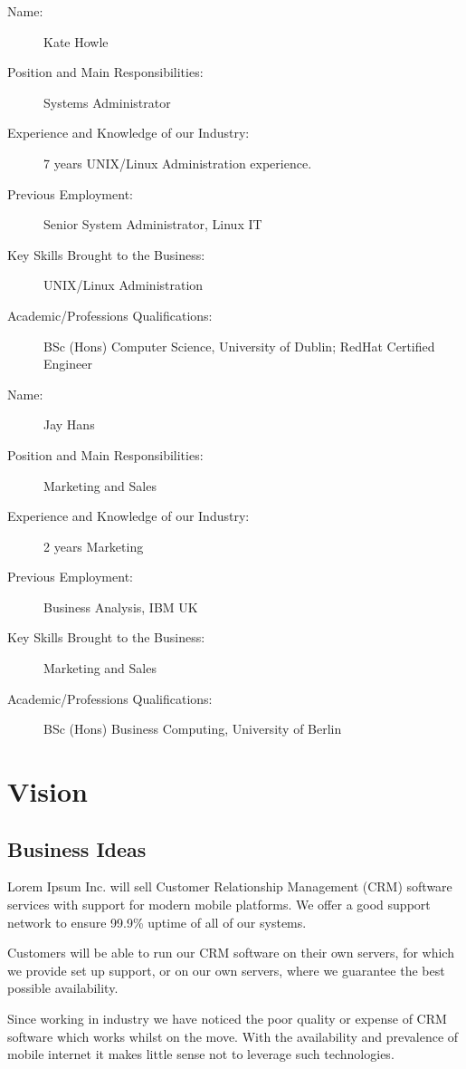 \documentclass[DIV=calc, paper=a4, fontsize=11pt]{scrartcl}	 %
\begin{document}
\begin{description}
\item[Name:] Kate Howle
\item[Position and Main Responsibilities:] Systems Administrator
\item[Experience and Knowledge of our Industry:] 7 years UNIX/Linux Administration experience.
\item[Previous Employment:] Senior System Administrator, Linux IT
\item[Key Skills Brought to the Business:] UNIX/Linux Administration
\item[Academic/Professions Qualifications:] BSc (Hons) Computer Science, University of Dublin; 
RedHat Certified Engineer
\end{description}

\begin{description}
\item[Name:] Jay Hans
\item[Position and Main Responsibilities:] Marketing and Sales
\item[Experience and Knowledge of our Industry:] 2 years Marketing
\item[Previous Employment:] Business Analysis, IBM UK
\item[Key Skills Brought to the Business:] Marketing and Sales
\item[Academic/Professions Qualifications:] BSc (Hons) Business Computing, University of Berlin
\end{description}


\section{Vision}

\subsection{Business Ideas}
Lorem Ipsum Inc. will sell Customer Relationship Management (CRM) software services with support
for modern mobile platforms. We offer a good support network to ensure 99.9\% uptime of all of our
systems.

Customers will be able to run our CRM software on their own servers, for which we provide set up
support, or on our own servers, where we guarantee the best possible availability.

Since working in industry we have noticed the poor quality or expense of CRM software which works
whilst on the move. With the availability and prevalence of mobile internet it makes little sense
not to leverage such technologies.
\end{document}
